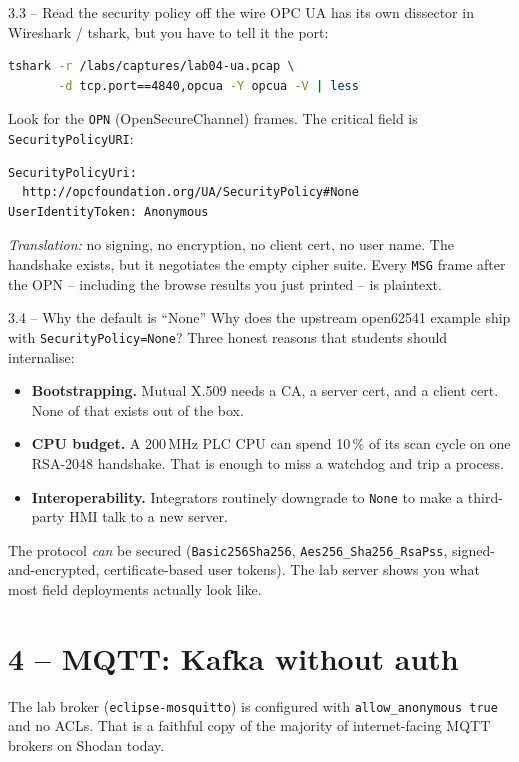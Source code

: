 \documentclass[11pt,a4paper]{article}
\begin{document}
\begin{stepbox}{3.3 -- Read the security policy off the wire}
OPC UA has its own dissector in Wireshark / tshark, but you have to tell
it the port:
\begin{lstlisting}[language=bash]
tshark -r /labs/captures/lab04-ua.pcap \
       -d tcp.port==4840,opcua -Y opcua -V | less
\end{lstlisting}
Look for the \texttt{OPN} (OpenSecureChannel) frames. The critical field
is \texttt{SecurityPolicyURI}:
\begin{lstlisting}
SecurityPolicyUri:
  http://opcfoundation.org/UA/SecurityPolicy#None
UserIdentityToken: Anonymous
\end{lstlisting}
\emph{Translation:} no signing, no encryption, no client cert, no user
name. The handshake exists, but it negotiates the empty cipher suite.
Every \texttt{MSG} frame after the OPN -- including the browse results
you just printed -- is plaintext.
\end{stepbox}

\begin{stepbox}{3.4 -- Why the default is ``None''}
Why does the upstream open62541 example ship with
\texttt{SecurityPolicy=None}? Three honest reasons that students should
internalise:
\begin{itemize}[leftmargin=*, nosep]
  \item \textbf{Bootstrapping.} Mutual X.509 needs a CA, a server cert,
        and a client cert. None of that exists out of the box.
  \item \textbf{CPU budget.} A 200\,MHz PLC CPU can spend 10\,\% of its
        scan cycle on one RSA-2048 handshake. That is enough to miss a
        watchdog and trip a process.
  \item \textbf{Interoperability.} Integrators routinely downgrade to
        \texttt{None} to make a third-party HMI talk to a new server.
\end{itemize}
The protocol \emph{can} be secured (\texttt{Basic256Sha256},
\texttt{Aes256\_Sha256\_RsaPss}, signed-and-encrypted, certificate-based
user tokens). The lab server shows you what most field deployments
actually look like.
\end{stepbox}

\section*{4 -- MQTT: Kafka without auth}

The lab broker (\texttt{eclipse-mosquitto}) is configured with
\texttt{allow\_anonymous true} and no ACLs. That is a faithful copy of
the majority of internet-facing MQTT brokers on Shodan today.
\end{document}
